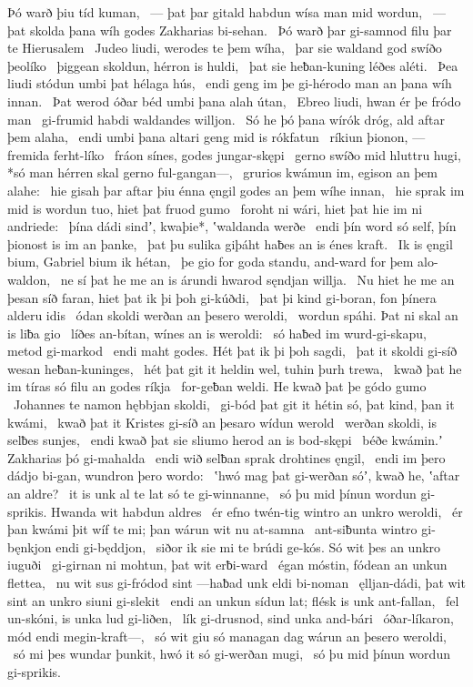 Þó warð þiu tíd kuman, \hld\ — þat þar gitald habdun
wísa man mid wordun, \hld\ — þat skolda þana wíh godes
Zakharias bi-sehan. \hld\ Þó warð þar gi-samnod filu
þar te Hierusalem \hld\ Judeo liudi,
werodes te þem wíha, \hld\ þar sie waldand god
swíðo þeolíko \hld\ þiggean skoldun,
hérron is huldi, \hld\ þat sie heƀan-kuning
léðes aléti. \hld\ Þea liudi stódun
umbi þat hélaga hús, \hld\ endi geng im þe gi-hérodo man
an þana wíh innan. \hld\ Þat werod óðar béd
umbi þana alah útan, \hld\ Ebreo liudi,
hwan ér þe fródo man \hld\ gi-frumid habdi
waldandes willjon. \hld\ Só he þó þana wírók dróg,
ald aftar þem alaha, \hld\ endi umbi þana altari geng
mid is rókfatun \hld\ ríkiun þionon,
—fremida ferht-líko \hld\ fráon sínes,
godes jungar-skępi \hld\ gerno swíðo
mid hluttru hugi, *só man hérren skal
gerno ful-gangan—, \hld\ grurios kwámun im,
egison an þem alahe: \hld\ hie gisah þar aftar þiu énna ęngil godes
an þem wíhe innan, \hld\ hie sprak im mid is wordun tuo,
hiet þat fruod gumo \hld\ foroht ni wári,
hiet þat hie im ni andriede: \hld\ þína dádi sindʼ, kwaþie*,
ʽwaldanda werðe \hld\ endi þín word só self,
þín þionost is im an þanke, \hld\ þat þu sulika giþáht haƀes
an is énes kraft. \hld\ Ik is ęngil bium,
Gabriel bium ik hétan, \hld\ þe gio for goda standu,
and-ward for þem alo-waldon, \hld\ ne sí þat he me an is árundi hwarod
sęndjan willja. \hld\ Nu hiet he me an þesan síð faran,
hiet þat ik þi þoh gi-kúðdi, \hld\ þat þi kind gi-boran,
fon þínera alderu idis \hld\ ódan skoldi
werðan an þesero weroldi, \hld\ wordun spáhi.
Þat ni skal an is liƀa gio \hld\ líðes an-bítan,
wínes an is weroldi: \hld\ só haƀed im wurd-gi-skapu,
metod gi-markod \hld\ endi maht godes.
Hét þat ik þi þoh sagdi, \hld\ þat it skoldi gi-síð wesan
heƀan-kuninges, \hld\ hét þat git it heldin wel,
tuhin þurh trewa, \hld\ kwað þat he im tíras só filu
an godes ríkja \hld\ for-geƀan weldi.
He kwað þat þe gódo gumo \hld\ Johannes te namon
hębbjan skoldi, \hld\ gi-bód þat git it hétin só,
þat kind, þan it kwámi, \hld\ kwað þat it Kristes gi-síð
an þesaro wídun werold \hld\ werðan skoldi,
is selƀes sunjes, \hld\ endi kwað þat sie sliumo herod
an is bod-skępi \hld\ béðe kwámin.ʼ
Zakharias þó gi-mahalda \hld\ endi wið selƀan sprak
drohtines ęngil, \hld\ endi im þero dádjo bi-gan,
wundron þero wordo: \hld\ ʽhwó mag þat gi-werðan sóʼ, kwað he,
ʽaftar an aldre? \hld\ it is unk al te lat
só te gi-winnanne, \hld\ só þu mid þínun wordun gi-sprikis.
Hwanda wit habdun aldres \hld\ ér efno twén-tig
wintro an unkro weroldi, \hld\ ér þan kwámi þit wíf te mi;
þan wárun wit nu at-samna \hld\ ant-siƀunta wintro
gi-bęnkjon endi gi-będdjon, \hld\ siðor ik sie mi te brúdi ge-kós.
Só wit þes an unkro iuguði \hld\ gi-girnan ni mohtun,
þat wit erƀi-ward \hld\ égan móstin,
fódean an unkun flettea, \hld\ nu wit sus gi-fródod sint
—haƀad unk eldi bi-noman \hld\ ęlljan-dádi,
þat wit sint an unkro siuni gi-slekit \hld\ endi an unkun sídun lat;
flésk is unk ant-fallan, \hld\ fel un-skóni,
is unka lud gi-liðen, \hld\ lík gi-drusnod,
sind unka and-bári \hld\ óðar-líkaron,
mód endi megin-kraft—, \hld\ só wit giu só managan dag
wárun an þesero weroldi, \hld\ só mi þes wundar þunkit,
hwó it só gi-werðan mugi, \hld\ só þu mid þínun wordun gi-sprikis.

